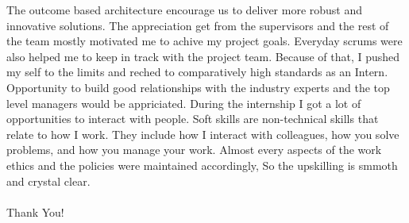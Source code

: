 \documentclass[twoside,12pt,times,onecolumn,a4paper]{report}
\begin{document}
The outcome based architecture encourage us to deliver more robust and innovative solutions. The appreciation get from the supervisors and the rest of the team mostly motivated me to achive my project goals. Everyday scrums were also helped me to keep in track with the project team. Because of that, I pushed my self to the limits and reched to comparatively high standards as an Intern. Opportunity to build good relationships with the industry experts and the top level managers would be appriciated. During the internship I got a lot of opportunities to interact with people. Soft skills are non-technical skills that relate to how I work. They include how I interact with colleagues, how you solve problems, and how you manage your work. Almost every aspects of the work ethics and the policies were maintained accordingly, So the upskilling is smmoth and crystal clear. \\\\

\centering
Thank You!




\medskip

\appendix


\end{document}
